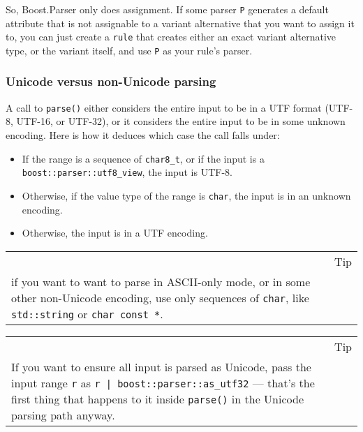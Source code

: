 So, Boost.Parser only does assignment. If some parser \texttt{P} generates a default attribute that is not assignable to a variant alternative that you want to assign it to, you can just create a \texttt{rule} that creates either an exact variant alternative type, or the variant itself, and use \texttt{P} as your rule's parser.

\subsubsection{Unicode versus non-Unicode parsing}

A call to \texttt{parse()} either considers the entire input to be in a UTF format (UTF-8, UTF-16, or UTF-32), or it considers the entire input to be in some unknown encoding. Here is how it deduces which case the call falls under:

\begin{itemize}
\item
  If the range is a sequence of \texttt{char8\_t}, or if the input is a \texttt{boost::parser::utf8\_view}, the input is UTF-8.
\item
  Otherwise, if the value type of the range is \texttt{char}, the input is in an unknown encoding.
\item
  Otherwise, the input is in a UTF encoding.
\end{itemize}

\begin{longtable}[]{@{}
  >{\raggedright\arraybackslash}p{}
  >{\raggedright\arraybackslash}p{}@{}}
\toprule\noalign{}
\endhead
\bottomrule\noalign{}
\endlastfoot
\begin{minipage}[t]{\linewidth}\raggedright
\end{minipage} & Tip \\
if you want to want to parse in ASCII-only mode, or in some other non-Unicode encoding, use only sequences of \texttt{char}, like \texttt{std::string} or \texttt{char const *}. & \\
\end{longtable}

\begin{longtable}[]{@{}
  >{\raggedright\arraybackslash}p{}
  >{\raggedright\arraybackslash}p{}@{}}
\toprule\noalign{}
\endhead
\bottomrule\noalign{}
\endlastfoot
\begin{minipage}[t]{\linewidth}\raggedright
\end{minipage} & Tip \\
If you want to ensure all input is parsed as Unicode, pass the input range \texttt{r} as \texttt{r | boost::parser::as\_utf32} --- that's the first thing that happens to it inside \texttt{parse()} in the Unicode parsing path anyway. & \\
\end{longtable}

